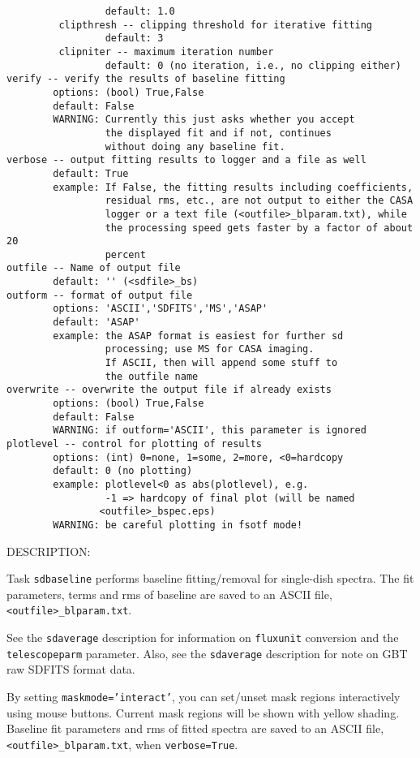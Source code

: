 \begin{verbatim}
                 default: 1.0
         clipthresh -- clipping threshold for iterative fitting
                 default: 3
         clipniter -- maximum iteration number
                 default: 0 (no iteration, i.e., no clipping either)
verify -- verify the results of baseline fitting
        options: (bool) True,False
        default: False
        WARNING: Currently this just asks whether you accept
                 the displayed fit and if not, continues
                 without doing any baseline fit.
verbose -- output fitting results to logger and a file as well
        default: True
        example: If False, the fitting results including coefficients, 
                 residual rms, etc., are not output to either the CASA 
                 logger or a text file (<outfile>_blparam.txt), while 
                 the processing speed gets faster by a factor of about 20 
                 percent
outfile -- Name of output file
        default: '' (<sdfile>_bs)
outform -- format of output file
        options: 'ASCII','SDFITS','MS','ASAP'
        default: 'ASAP'
        example: the ASAP format is easiest for further sd
                 processing; use MS for CASA imaging.
                 If ASCII, then will append some stuff to
                 the outfile name
overwrite -- overwrite the output file if already exists
        options: (bool) True,False
        default: False
        WARNING: if outform='ASCII', this parameter is ignored
plotlevel -- control for plotting of results
        options: (int) 0=none, 1=some, 2=more, <0=hardcopy
        default: 0 (no plotting)
        example: plotlevel<0 as abs(plotlevel), e.g.
                 -1 => hardcopy of final plot (will be named
                <outfile>_bspec.eps)
        WARNING: be careful plotting in fsotf mode!

\end{verbatim}

    DESCRIPTION:

    Task {\tt sdbaseline} performs baseline fitting/removal for single-dish spectra.
    The fit parameters, terms and rms of baseline are saved to an ASCII
    file, {\tt <outfile>\_blparam.txt}.

    See the {\tt sdaverage} description for information on {\tt fluxunit} 
    conversion and the {\tt telescopeparm} parameter.
    Also, see the {\tt sdaverage} description for note on GBT raw SDFITS format data.

    By setting {\tt maskmode='interact'}, you can set/unset mask regions interactively using
    mouse buttons. Current mask regions will be shown with yellow shading.
    Baseline fit parameters and rms of fitted spectra are saved to an
    ASCII file, {\tt <outfile>\_blparam.txt}, when {\tt verbose=True}.

